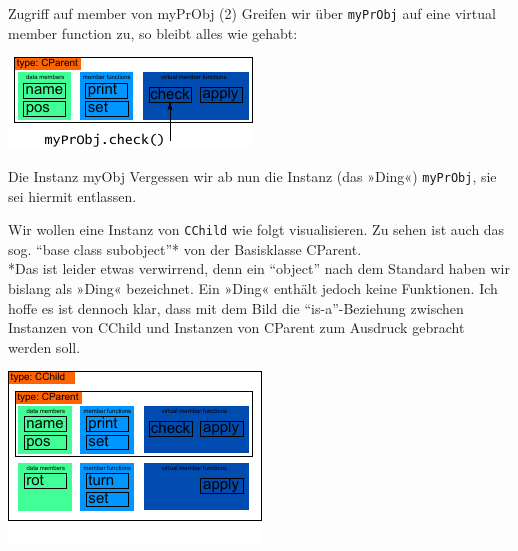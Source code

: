 \begin{frame}[fragile,b]{Zugriff auf member von myPrObj (2)}
	Greifen wir über \verb|myPrObj| auf eine virtual member function zu, so bleibt alles wie gehabt:
	
	\vspace{2em}
	
	\includegraphics[width=0.5\linewidth]{images/myPrObj-check}
\end{frame}

\begin{frame}[fragile,b]{Die Instanz myObj}
	\tiny Vergessen wir ab nun die Instanz (das »Ding«) \verb|myPrObj|, sie sei hiermit entlassen.
	\normalsize
	
	\vspace{2em}
	
	Wir wollen eine Instanz von \verb|CChild| wie folgt visualisieren.
	Zu sehen ist auch das sog. \enquote{base class subobject}* von der Basisklasse CParent.\\
	\vspace{0.5em}
	\tiny
	*Das ist leider etwas verwirrend, denn ein \enquote{object} nach dem Standard haben wir bislang als »Ding« bezeichnet. Ein »Ding« enthält jedoch keine Funktionen. Ich hoffe es ist dennoch klar, dass mit dem Bild die \enquote{is-a}-Beziehung zwischen Instanzen von CChild und Instanzen von CParent zum Ausdruck gebracht werden soll.
	
	\vspace{2em}
	
	\includegraphics[width=0.5\linewidth]{images/myObj}
\end{frame}

